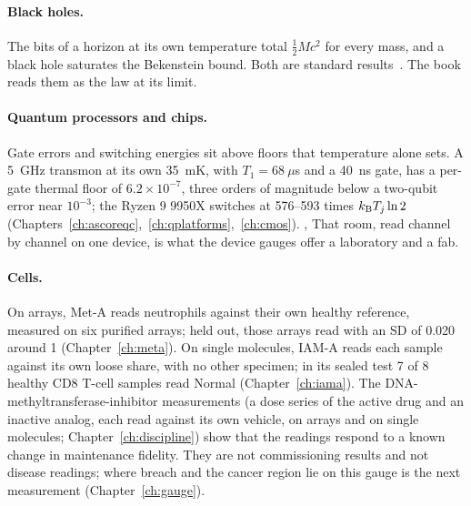 \paragraph{Black holes.} The bits of a horizon at its own temperature total $\tfrac12Mc^2$ for every mass, and a black hole saturates the
Bekenstein bound. Both are standard results~\cite{Bekenstein1973,Hawking1975}. \derived{} The book reads them as the law at its limit. \interp

\paragraph{Quantum processors and chips.} Gate errors and switching energies sit above floors that temperature alone sets. A 5~GHz transmon
at its own 35~mK, with $T_1=68~\mu$s and a 40~ns gate, has a per-gate thermal floor of $6.2\times10^{-7}$, three orders of magnitude below a
two-qubit error near $10^{-3}$; the Ryzen 9 9950X switches at 576--593 times $k_{\mathrm B} T_j\ln2$
(Chapters~\ref{ch:ascoreqc},~\ref{ch:qplatforms},~\ref{ch:cmos}). \derived, \calc{} That room, read channel by channel on one device, is what the
device gauges offer a laboratory and a fab.

\paragraph{Cells.} On arrays, Met-A reads neutrophils against their own healthy reference, measured on six purified arrays; held out, those arrays read with an SD of 0.020 around 1 (Chapter~\ref{ch:meta}). \calibrated{} On single molecules, IAM-A reads each sample against its own loose share, with no other specimen; in its sealed test 7 of 8 healthy CD8 T-cell samples read Normal (Chapter~\ref{ch:iama}). \measured
\measured{} The DNA-methyltransferase-inhibitor measurements (a dose series of the active drug and an inactive analog, each read against its own vehicle, on arrays and on single molecules; Chapter~\ref{ch:discipline}) show that the readings respond to a known change in maintenance fidelity. They are not commissioning results and not disease
readings; where breach and the cancer region lie on this gauge is the next measurement (Chapter~\ref{ch:gauge}).

